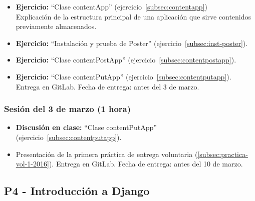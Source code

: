 \documentclass[a4paper,12pt]{article}
\begin{document}
\begin{itemize}

 \item \textbf{Ejercicio:}  ``Clase contentApp'' (ejercicio~\ref{subsec:contentapp}) \\
   Explicación de la estructura principal de una aplicación que sirve contenidos previamente almacenados.
 \item \textbf{Ejercicio:} ``Instalación y prueba de Poster'' (ejercicio~\ref{subsec:inst-poster}).
 \item \textbf{Ejercicio:} ``Clase contentPostApp'' (ejercicio~\ref{subsec:contentpostapp}).
 \item \textbf{Ejercicio:} ``Clase contentPutApp'' (ejercicio~\ref{subsec:contentputapp}).
Entrega en GitLab. Fecha de entrega: antes del 3 de marzo.
\end{itemize}


\subsubsection{Sesión del 3 de marzo (1 hora)}

\begin{itemize}
  \item \textbf{Discusión en clase:} ``Clase contentPutApp'' (ejercicio~\ref{subsec:contentputapp}).
  \item Presentación de la primera práctica de entrega voluntaria (\ref{subsec:practica-vol-1-2016}). Entrega en GitLab. Fecha de entrega: antes del 10 de marzo.
\end{itemize}


\subsection{P4 - Introducción a Django}
\end{document}
